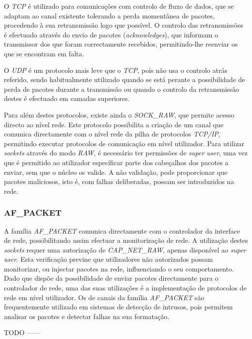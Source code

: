 O \textit{TCP} é utilizado para comunicações com controlo de fluxo de dados, que se adaptam ao canal existente tolerando a perda momentânea de pacotes, procedendo à sua retransmissão logo que possível.
O controlo das retransmissões é efectuado através do envio de pacotes (\textit{acknowledges}), que informam o transmissor dos que foram correctamente recebidos, permitindo-lhe reenviar os que se encontram em falta.

O \textit{UDP} é um protocolo mais leve que o \textit{TCP}, pois não usa o controlo atrás referido, sendo habitualmente utilizado quando se está perante a possibilidade de perda de pacotes durante a transmissão ou quando o controlo da retransmissão destes é efectuado em camadas superiores.

Para além destes protocolos, existe ainda o \textit{SOCK\_RAW}, que permite acesso directo ao nível rede.
Este protocolo possibilita a criação de um canal que comunica directamente com o nível rede da pilha de protocolos \textit{TCP/IP}, permitindo executar protocolos de comunicação em nível utilizador.
Para utilizar \textit{sockets} através do modo \textit{RAW}, é necessário ter permissões de \textit{super user}, uma vez que é permitido ao utilizador específicar parte dos cabeçalhos dos pacotes a enviar, sem que o núcleo os valide.
A não validação, pode proporcionar que pacotes maliciosos, isto é, com falhas deliberadas, possam ser introduzidos na rede.
 
\subsubsection{AF\_PACKET}
\label{subsub:af_packet}

A família \textit{AF\_PACKET} comunica directamente com o controlador da interface de rede, possibilitando assim efectuar a monitorização de rede.
A utilização destes \textit{sockets} requer uma autorização de \textit{CAP\_NET\_RAW}, apenas disponível ao \textit{super user}.
Esta verificação previne que utilizadores não autorizados possam monitorizar, ou injectar pacotes na rede, influenciando o seu comportamento.
Dado que dispõe da possibilidade de enviar pacotes directamente para o controlador de rede, uma das suas utilizações é a implementação de protocolos de rede em nível utilizador.
Os de canais da família \textit{AF\_PACKET} são frequentemente utilizado em sistemas de detecção de intrusos, pois permitem analisar os pacotes e detectar falhas na sua formatação.

TODO ------

